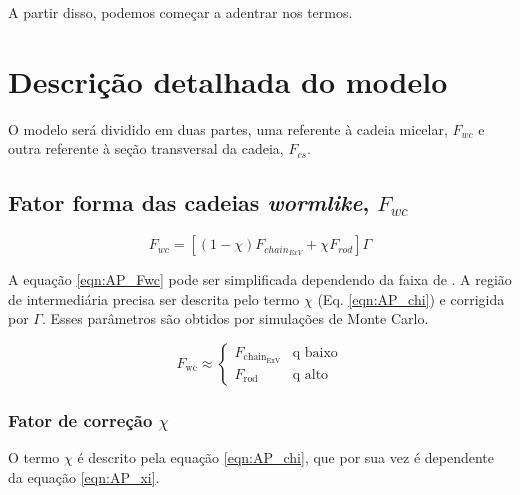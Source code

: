 \begin{apendicesenv}
A partir disso, podemos começar a adentrar nos termos.

\section{Descrição detalhada do modelo}

O modelo será dividido em duas partes, uma referente à cadeia micelar, $F_{wc}$ e outra referente à seção transversal da cadeia, $F_{cs}$.

\subsection{Fator forma das cadeias \emph{wormlike}, $F_{wc}$}
\label{sec:equacoes_Fwc}

\begin{equation}
F_{wc} = \left[\left(1 - \chi\right)F_{chain_{ExV}} + \chi F_{rod}\right]\Gamma
\label{eqn:AP_Fwc}
\end{equation}

A equação \ref{eqn:AP_Fwc} pode ser simplificada dependendo da faixa de \q. A região de \q intermediária precisa ser descrita pelo termo $\chi$ (Eq. \ref{eqn:AP_chi}) e corrigida por $\Gamma$. Esses parâmetros são obtidos por simulações de Monte Carlo.

\begin{equation}
	F_{\text{wc}} \approx 
		\begin{cases}
			F_{\text{chain}_{\text{ExV}}}		& \text{q baixo}  \\
			F_{\text{rod}}						& \text{q alto}
		\end{cases}
	\label{eqn:AP_Fwc_dois_casos}
\end{equation}


\subsubsection{Fator de correção $\chi$}
O termo $\chi$ é descrito pela equação \ref{eqn:AP_chi}, que por sua vez é dependente da equação \ref{eqn:AP_xi}.


\end{apendicesenv}
